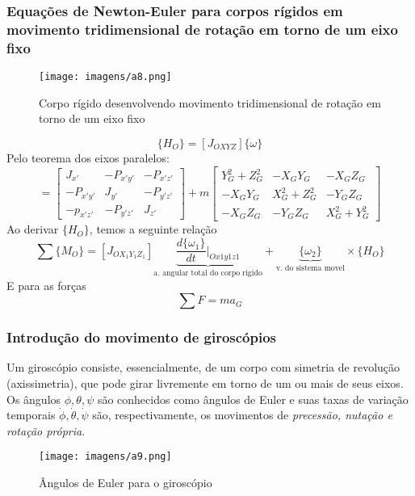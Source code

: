 \documentclass[a4paper, 12pt]{article}
\begin{document}
	\subsubsection{Equações de Newton-Euler para corpos rígidos em movimento tridimensional de rotação em torno de um eixo fixo}
		\begin{figure}[h]
			\center
			\texttt{[image: imagens/a8.png]} 
			\caption{Corpo rígido desenvolvendo movimento tridimensional de rotação em torno de um eixo fixo}
		\end{figure}
		\begin{equation}
			\{H_O\} = [J_{OXYZ}]\{\omega \}
		\end{equation}
		Pelo teorema dos eixos paralelos:
		\begin{equation}
			[J_{OXYZ}] = \begin{bmatrix}
			J_{x'} & -P_{x'y'} & -P_{x'z'}\\
			-P_{x'y'} & J_{y'} & -P_{y'z'}\\
			-p_{x'z'} & -P_{y'z'} & J_{z'}
			\end{bmatrix} + m\begin{bmatrix}
			 Y_G^2 + Z^2_G & -X_GY_G & -X_GZ_G\\
			 -X_GY_G & X^2_G+Z^2_G & -Y_GZ_G\\
			 -X_GZ_G & -Y_GZ_G & X^2_G + Y_G^2
			\end{bmatrix}
		\end{equation}
		Ao derivar $\{H_O\}$, temos a seguinte relação
		\begin{equation}
			\boxed{
			\sum \{M_O\} = [J_{OX_1Y_1Z_1}]\underbrace{\frac{d\{\omega_1 \}}{dt}|_{Ox1y1z1}}_{\text{a. angular total do corpo rigido}} + \underbrace{\{\omega_2 \}}_{\text{v. do sistema movel}} \times \{H_O\}
			}
		\end{equation}
		E para as forças
		\begin{equation}
			\sum F = ma_G
		\end{equation}

		\subsubsection{Introdução do movimento de giroscópios}
		Um giroscópio consiste, essencialmente, de um corpo com simetria de revolução (axissimetria), que pode girar livremente em torno de um ou mais de seus eixos.\\
		
		Os ângulos $\phi , \theta , \psi$ são conhecidos como ângulos de Euler e suas taxas de variação temporais  $\dot{\phi} , \dot{\theta} , \dot{\psi}$ são, respectivamente, os movimentos de \textit{precessão, nutação e rotação própria}.
		\begin{figure}[h]
			\center
			\texttt{[image: imagens/a9.png]} 
			\caption{Ângulos de Euler para o giroscópio}
		\end{figure}
		
\end{document}
